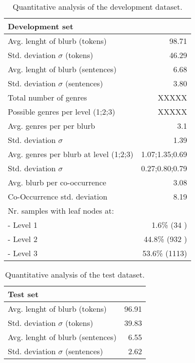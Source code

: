 \documentclass[11pt,a4paper]{article}
\begin{document}
\begin{table}
\small
\begin{center}
\begin{tabular}{|l|r|}
\hline\centering\textbf{Development set}  &             \\
\hline
Avg. lenght of blurb (tokens)              &   98.71        \\
Std. deviation $\sigma$ (tokens)           &   46.29        \\
Avg. lenght of blurb (sentences)           &   6.68         \\
Std. deviation $\sigma$ (sentences)        &   3.80         \\
\hline
Total number of genres                     &   XXXXX           \\
Possible genres per level (1;2;3)          &   XXXXX           \\
Avg. genres per per blurb                  &   3.1             \\
Std. deviation $\sigma$                    &   1.39            \\
Avg. genres per blurb at level (1;2;3)     &   1.07;1.35;0.69  \\
Std. deviation $\sigma$                    &   0.27;0.80;0.79  \\
\hline
Avg. blurb per co-occurrence               &   3.08            \\
Co-Occurrence std. deviation               &   8.19            \\
\hline
Nr. samples with leaf nodes at:            &                   \\
 - Level 1                                 &    1.6\% (34 )    \\
 - Level 2                                 &    44.8\% (932 )  \\
 - Level 3                                 &    53.6\% (1113)  \\
\hline
\end{tabular}
\end{center}
\caption{\label{quantitivy-analysis-dev}Quantitative analysis of the development dataset.}
\end{table}


\begin{table}
\small
\begin{center}
\begin{tabular}{|l|r|}
\hline\centering\textbf{Test set}  &         \\
\hline
Avg. lenght of blurb (tokens)              &  96.91             \\
Std. deviation $\sigma$ (tokens)           &  39.83             \\
Avg. lenght of blurb (sentences)           &  6.55              \\
Std. deviation $\sigma$ (sentences)        &  2.62              \\
\hline
\end{tabular}
\end{center}
\caption{\label{quantitivy-analysis-test}Quantitative analysis of the test dataset.}
\end{table}
\end{document}
